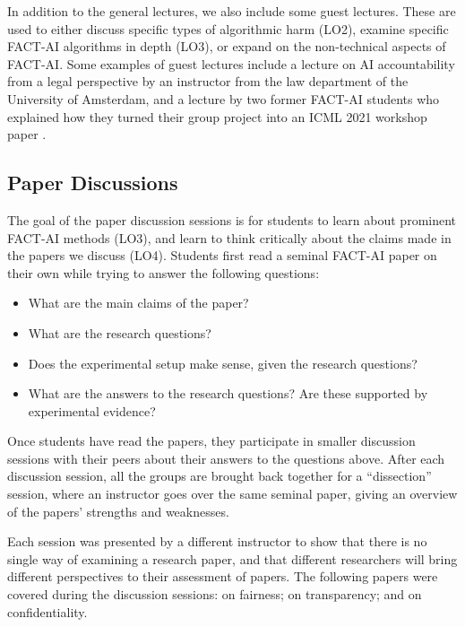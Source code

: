 \documentclass[letterpaper]{article}
\newcommand{\OurUniversity}{the University of Amsterdam}
\begin{document}
In addition to the general lectures, we also include some guest lectures.
These are used to either discuss specific types of algorithmic harm (LO2), examine specific FACT-AI algorithms in depth (LO3), or expand on the non-technical aspects of FACT-AI.
Some examples of guest lectures include a lecture on AI accountability from a legal perspective by an instructor from the law department of \OurUniversity{}, and a lecture by two former FACT-AI students who explained how they turned their group project into an ICML 2021 workshop paper \cite{neely2021order}.

\subsection{Paper Discussions}
The goal of the paper discussion sessions is for students to learn about prominent FACT-AI methods (LO3), and learn to think critically about the claims made in the papers we discuss (LO4).
Students first read a seminal FACT-AI paper on their own while trying to answer the following questions:
\begin{itemize}[leftmargin=*,nosep]
\item What are the main claims of the paper?
\item What are the research questions?
\item Does the experimental setup make sense, given the research questions?
\item What are the answers to the research questions? Are these supported by experimental evidence?
\end{itemize}

\noindent%
Once students have read the papers, they participate in smaller discussion sessions with their peers about their answers to the questions above.
After each discussion session, all the groups are brought back together for a ``dissection'' session, where an instructor goes over the same seminal paper, giving an overview of the papers' strengths and weaknesses.

Each session was presented by a different instructor to show that there is no single way of examining a research paper, and that different researchers will bring different perspectives to their assessment of papers.
The following papers were covered during the discussion sessions:
\citet{hardt_equality_2016} on fairness;
\citet{ribeiro_why_2016} on transparency; and
\citet{Abadi_2016} on confidentiality.
\end{document}
